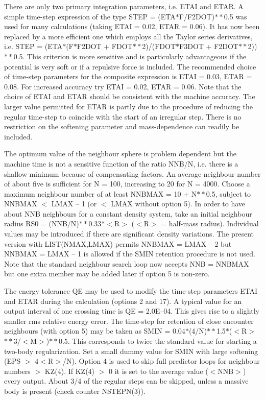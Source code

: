  There are only two primary integration parameters, i.e. ETAI and ETAR.  A
 simple time-step expression of the type STEP = (ETA$\ast$F/F2DOT)$\ast\ast$0.5
 was used for
 many calculations (taking ETAI = 0.02, ETAR = 0.06).  It has now been replaced
 by a more efficient one which employs all the Taylor series derivatives, i.e.
 STEP = (ETA$\ast$(F$\ast$F2DOT + FDOT$\ast\ast$2)/(FDOT$\ast$F3DOT +
 F2DOT$\ast\ast$2))$\ast\ast$0.5.  This criterion
 is more sensitive and is particularly
 advantageous if the potential is very soft or if a repulsive force is
 included.  The recommended choice of time-step parameters for the composite
 expression is ETAI = 0.03, ETAR = 0.08.  For increased accuracy try
 ETAI = 0.02, ETAR = 0.06.  Note that the choice of ETAI and ETAR should be
 consistent with the machine accuracy.  The larger value permitted for ETAR
 is partly due to the procedure of reducing the regular time-step to coincide
 with the start of an irregular step.  There is no restriction on the softening
 parameter and mass-dependence can readily be included.

 The optimum value of the neighbour sphere is problem dependent but the
 machine time is not a sensitive function of the ratio NNB/N, i.e. there is a
 shallow minimum because of compensating factors.  An average neighbour
 number of about five is sufficient for N = 100, increasing to
 20 for N = 4000.  Choose a maximum neighbour number of at least
 NNBMAX = 10 + N$\ast\ast$0.5, subject to NNBMAX $<$ LMAX -- 1 (or $<$ LMAX
 without
 option 5).  In order to have about NNB neighbours for a constant
 density system, take an initial neighbour radius
 RS0 = (NNB/N)$\ast\ast$0.33$\ast$$<$R$>$ ($<$R$>$ = half-mass radius).
 Individual values
 may be introduced if
 there are significant density variations.  The present version with
 LIST(NMAX,LMAX) permits NNBMAX = LMAX -- 2 but NNBMAX = LMAX -- 1 is allowed
 if the SMIN retention procedure is
 not used.  Note that the standard neighbour search loop now accepts
 NNB = NNBMAX but one extra member may be added later if option 5 is non-zero.

 The energy tolerance QE may be used to modify the time-step parameters ETAI
  and ETAR during the calculation (options 2 and 17).  A typical value
 for an output interval of one crossing time is QE = 2.0E--04.  This gives
 rise to a slightly smaller rms relative energy error.  The time-step for
 retention of close encounter neighbours (with option 5) may be taken
 as SMIN =
 0.04$\ast$(4/N)$\ast\ast$1.5$\ast$($<$R$>$$\ast\ast$3/$<$M$>$)$\ast\ast$0.5.
 This corresponds to twice
 the standard value for starting a two-body regularization.  Set a small dummy
 value for SMIN with large softening (EPS $>$ 4$<$R$>$/N).  Option 4 is used
 to skip full predictor loops for neighbour numbers $>$ KZ(4).  If
 KZ(4) $>$ 0 it is set to the average value ($<$NNB$>$) every output.  About
 3/4 of the regular steps can be skipped, unless a massive body
 is present (check counter NSTEPN(3)).

